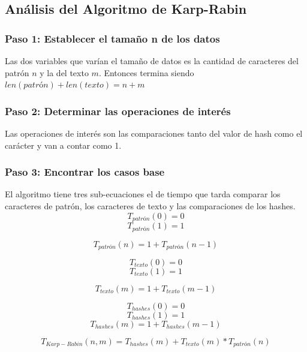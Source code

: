         


\subsection*{Análisis del Algoritmo de Karp-Rabin}

\subsubsection*{Paso 1: Establecer el tamaño n de los datos}
Las dos variables que varían el tamaño de datos es la cantidad de caracteres del patrón $n$ y la del texto $m$. Entonces termina siendo $len(patrón) + len(texto) = n + m$

\subsubsection*{Paso 2: Determinar las operaciones de interés}
Las operaciones de interés son las comparaciones tanto del valor de hash como el carácter y van a contar como 1.

\subsubsection*{Paso 3: Encontrar los casos base}
El algoritmo tiene tres sub-ecuaciones el de tiempo que tarda comparar los caracteres de patrón, los caracteres de texto y las comparaciones de los hashes.
\[T_{patrón}(0) =  0\]
\[T_{patrón}(1) = 1\]

\[T_{patrón}(n) = 1 + T_{patrón}(n-1)\]

\[T_{texto}(0) =  0\]
\[T_{texto}(1) = 1\]

\[T_{texto}(m) = 1 + T_{texto}(m-1)\]

\[T_{hashes}(0) = 0\]
\[T_{hashes}(1) = 1\]
\[T_{hashes}(m) = 1 + T_{hashes}(m-1)\]


\[T_{Karp-Rabin}(n,m) = T_{hashes}(m) + T_{texto}(m) * T_{patrón}(n)\]

